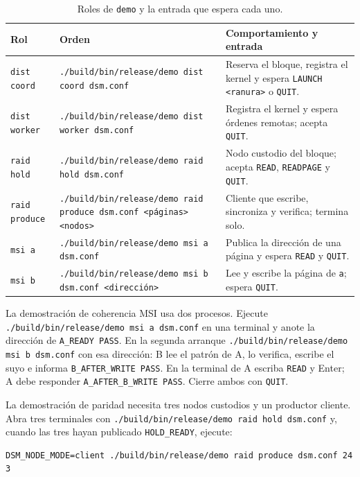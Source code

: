 \begin{table}[H]
\centering
\footnotesize
\caption{Roles de \texttt{demo} y la entrada que espera cada uno.}
\label{tab:demo-roles}
\begin{tabularx}{\textwidth}{@{}P{2.0cm} P{6.7cm} Y@{}}
\toprule
Rol & Orden & Comportamiento y entrada \\
\midrule
\texttt{dist coord} & \texttt{./build/bin/release/demo dist coord dsm.conf} & Reserva el bloque, registra el kernel y espera \texttt{LAUNCH <ranura>} o \texttt{QUIT}. \\
\texttt{dist worker} & \texttt{./build/bin/release/demo dist worker dsm.conf} & Registra el kernel y espera órdenes remotas; acepta \texttt{QUIT}. \\
\texttt{raid hold} & \texttt{./build/bin/release/demo raid hold dsm.conf} & Nodo custodio del bloque; acepta \texttt{READ}, \texttt{READPAGE} y \texttt{QUIT}. \\
\texttt{raid produce} & \texttt{./build/bin/release/demo raid produce dsm.conf <páginas> <nodos>} & Cliente que escribe, sincroniza y verifica; termina solo. \\
\texttt{msi a} & \texttt{./build/bin/release/demo msi a dsm.conf} & Publica la dirección de una página y espera \texttt{READ} y \texttt{QUIT}. \\
\texttt{msi b} & \texttt{./build/bin/release/demo msi b dsm.conf <dirección>} & Lee y escribe la página de \texttt{a}; espera \texttt{QUIT}. \\
\bottomrule
\end{tabularx}
\end{table}

La demostración de coherencia MSI usa dos procesos. Ejecute \texttt{./build/bin/release/demo msi a dsm.conf} en una terminal y anote la dirección de \texttt{A\_READY PASS}. En la segunda arranque \texttt{./build/bin/release/demo msi b dsm.conf} con esa dirección: B lee el patrón de A, lo verifica, escribe el suyo e informa \texttt{B\_AFTER\_WRITE PASS}. En la terminal de A escriba \texttt{READ} y Enter; A debe responder \texttt{A\_AFTER\_B\_WRITE PASS}. Cierre ambos con \texttt{QUIT}.

La demostración de paridad necesita tres nodos custodios y un productor cliente. Abra tres terminales con \texttt{./build/bin/release/demo raid hold dsm.conf} y, cuando las tres hayan publicado \texttt{HOLD\_READY}, ejecute:

\begin{lstlisting}
DSM_NODE_MODE=client ./build/bin/release/demo raid produce dsm.conf 24 3
\end{lstlisting}

